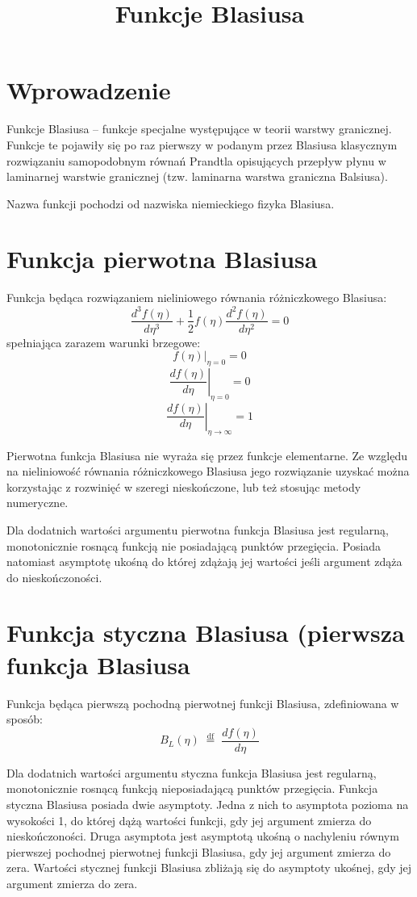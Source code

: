 \documentclass{article}
\begin{document}
\title{Funkcje Blasiusa}
\maketitle

\section*{Wprowadzenie}
Funkcje Blasiusa – funkcje specjalne występujące w teorii warstwy granicznej. Funkcje te pojawiły się po raz pierwszy w podanym przez Blasiusa klasycznym rozwiązaniu samopodobnym równań Prandtla opisujących przepływ płynu w laminarnej warstwie granicznej (tzw. laminarna warstwa graniczna Balsiusa).

Nazwa funkcji pochodzi od nazwiska niemieckiego fizyka Blasiusa. 

\section*{Funkcja pierwotna Blasiusa}
Funkcja będąca rozwiązaniem nieliniowego równania różniczkowego Blasiusa: 
\[ {\frac {d^{3}f(\eta )}{d\eta ^{3}}}+{\frac {1}{2}}f(\eta ){\frac {d^{2}f(\eta )}{d\eta ^{2}}}=0 \]
spełniająca zarazem warunki brzegowe:
\[ \left.f(\eta )\right|_{\eta =0}=0 \]
\[ \left.{\frac {df(\eta )}{d\eta }}\right|_{\eta =0}=0 \]
\[ \left.{\frac {df(\eta )}{d\eta }}\right|_{\eta \to \infty }=1 \]

Pierwotna funkcja Blasiusa nie wyraża się przez funkcje elementarne. Ze względu na nieliniowość równania różniczkowego Blasiusa jego rozwiązanie uzyskać można korzystając z rozwinięć w szeregi nieskończone, lub też stosując metody numeryczne.

Dla dodatnich wartości argumentu pierwotna funkcja Blasiusa jest regularną, monotonicznie rosnącą funkcją nie posiadającą punktów przegięcia. Posiada natomiast asymptotę ukośną do której zdążają jej wartości jeśli argument zdąża do nieskończoności. 

\section*{Funkcja styczna Blasiusa (pierwsza funkcja Blasiusa}
Funkcja będąca pierwszą pochodną pierwotnej funkcji Blasiusa, zdefiniowana w sposób: 
$$ B_{L}(\eta )\;{\stackrel {\mathrm {df} }{=}}\;{\frac {df(\eta )}{d\eta }} $$

Dla dodatnich wartości argumentu styczna funkcja Blasiusa jest regularną, monotonicznie rosnącą funkcją nieposiadającą punktów przegięcia. Funkcja styczna Blasiusa posiada dwie asymptoty. Jedna z nich to asymptota pozioma na wysokości 1, do której dążą wartości funkcji, gdy jej argument zmierza do nieskończoności. Druga asymptota jest asymptotą ukośną o nachyleniu równym pierwszej pochodnej pierwotnej funkcji Blasiusa, gdy jej argument zmierza do zera. Wartości stycznej funkcji Blasiusa zbliżają się do asymptoty ukośnej, gdy jej argument zmierza do zera.
\end{document}
